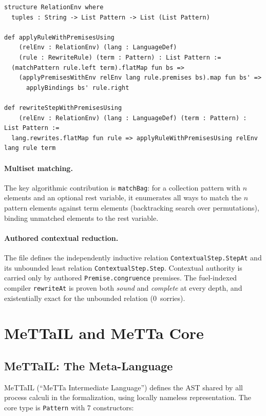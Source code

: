 \documentclass[]{article}
\newcommand{\code}[1]{\texttt{#1}}
\newcommand{\codepath}[1]{\path{#1}}
\newcommand{\MeTTaIL}{\textup{MeTTaIL}}
\begin{document}
\begin{lstlisting}[caption={Premise-aware generic rewrite step (Engine.lean)}]
structure RelationEnv where
  tuples : String -> List Pattern -> List (List Pattern)

def applyRuleWithPremisesUsing
    (relEnv : RelationEnv) (lang : LanguageDef)
    (rule : RewriteRule) (term : Pattern) : List Pattern :=
  (matchPattern rule.left term).flatMap fun bs =>
    (applyPremisesWithEnv relEnv lang rule.premises bs).map fun bs' =>
      applyBindings bs' rule.right

def rewriteStepWithPremisesUsing
    (relEnv : RelationEnv) (lang : LanguageDef) (term : Pattern) : List Pattern :=
  lang.rewrites.flatMap fun rule => applyRuleWithPremisesUsing relEnv lang rule term
\end{lstlisting}

\paragraph{Multiset matching.}
The key algorithmic contribution is \code{matchBag}: for a collection pattern with
$n$ elements and an optional rest variable, it enumerates all ways to match the $n$
pattern elements against term elements (backtracking search over permutations),
binding unmatched elements to the rest variable.

\paragraph{Authored contextual reduction.}
The file \codepath{MeTTaIL/ContextualStep.lean} defines the independently
inductive relation \code{ContextualStep.StepAt} and its unbounded least
relation \code{ContextualStep.Step}.  Contextual authority is carried only by
authored \code{Premise.congruence} premises.  The fuel-indexed compiler
\code{rewriteAt} is proven both \emph{sound} and \emph{complete} at every
depth, and existentially exact for the unbounded relation (0~sorries).

\section{MeTTaIL and MeTTa Core}

\subsection{MeTTaIL: The Meta-Language}

\MeTTaIL{} (``MeTTa Intermediate Language'') defines the AST shared by all process
calculi in the formalization, using locally nameless representation.  The core type is
\code{Pattern} with 7 constructors:
\end{document}
